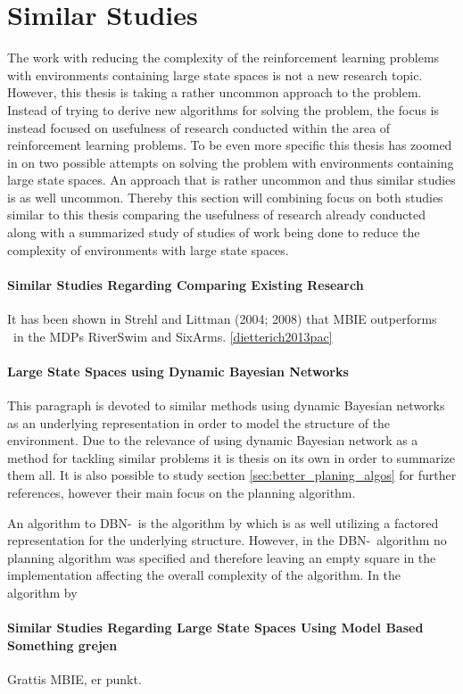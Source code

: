 \section{Similar Studies }
The work with reducing the complexity of the reinforcement learning problems with environments containing large state spaces is not a new research topic. However, this thesis is taking a rather uncommon approach to the problem. Instead of trying to derive new algorithms for solving the problem, the focus is instead focused on usefulness of research conducted within the area of reinforcement learning problems. To be even more specific this thesis has zoomed in on two possible attempts on solving the problem with environments containing large state spaces. An approach that is rather uncommon and thus similar studies is as well uncommon. 
Thereby this section will combining focus on both studies similar to this thesis comparing the usefulness of research already conducted along with a summarized study of studies of work being done to reduce the complexity of environments with large state spaces.


\paragraph{Similar Studies Regarding Comparing Existing Research}
It has been shown in Strehl and Littman (2004; 2008) that MBIE outperforms \etre\ in the MDPs RiverSwim and SixArms. \ref{dietterich2013pac}


\paragraph{Large State Spaces using Dynamic Bayesian Networks}
This paragraph is devoted to similar methods using dynamic Bayesian networks as an underlying representation in order to model the structure of the environment. Due to the relevance of using dynamic Bayesian network as a method for tackling similar problems it is thesis on its own in order to summarize them all. It is also possible to study section \ref{sec:better_planing_algos} for further references, however their main focus on the planning algorithm.

An algorithm to DBN-\etre\ is the algorithm by \textcite{ross2012model} which is as well utilizing a factored representation for the underlying structure. However, in the DBN-\etre\ algorithm no planning algorithm was specified and therefore leaving an empty square in the implementation affecting the overall complexity of the algorithm. In the algorithm by \textcite{ross2012model} 


\paragraph{Similar Studies Regarding Large State Spaces Using Model Based Something grejen}
Grattis MBIE, er punkt.